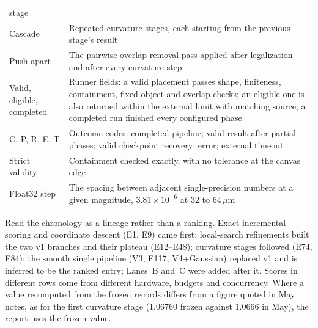 \begin{longtable}{@{}>{\raggedright\arraybackslash}p{3.3cm}%
                  >{\raggedright\arraybackslash}p{\dimexpr\linewidth-3.3cm-2\tabcolsep\relax}@{}}
stage \\
Cascade & Repeated curvature stages, each starting from the previous stage's result \\
Push-apart & The pairwise overlap-removal pass applied after legalization and after
every curvature step \\
Valid, eligible, completed & Runner fields: a valid placement passes shape, finiteness,
containment, fixed-object and overlap checks; an eligible one is also returned within
the external limit with matching source; a completed run finished every configured
phase \\
C, P, R, E, T & Outcome codes: completed pipeline; valid result after partial phases;
valid checkpoint recovery; error; external timeout \\
Strict validity & Containment checked exactly, with no tolerance at the canvas edge \\
Float32 step & The spacing between adjacent single-precision numbers at a given
magnitude, $3.81\times10^{-6}$ at 32 to $64\,\mu$m \\
\end{longtable}
\endgroup

Read the chronology as a lineage rather than a ranking. Exact incremental scoring and
coordinate descent (E1, E9) came first; local-search refinements built the two v1
branches and their plateau (E12--E48); curvature stages followed (E74, E84); the
smooth single pipeline (V3, E117, V4+Gaussian) replaced v1 and is inferred to be the
ranked entry; Lanes~B and~C were added after it. Scores in different rows come from different
hardware, budgets and concurrency. Where a value recomputed from the frozen records
differs from a figure quoted in May notes, as for the first curvature stage (1.06760
frozen against 1.0666 in May), the report uses the frozen value.


